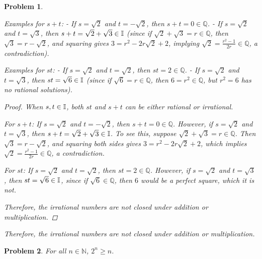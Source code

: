 \documentclass[12pt]{article}
\newtheorem{problem}{Problem}
\newcommand{\QQ}{\ensuremath{\mathbb Q}}
\newcommand{\NN}{\ensuremath{\mathbb N}}
\begin{document}
\begin{problem}
\begin{enumerate}[(a)]
Examples for $s + t$:
- If $s = \sqrt{2}$ and $t = -\sqrt{2}$, then $s + t = 0 \in \QQ$.
- If $s = \sqrt{2}$ and $t = \sqrt{3}$, then $s + t = \sqrt{2} + \sqrt{3} \in \mathbb{I}$ (since if $\sqrt{2} + \sqrt{3} = r \in \QQ$, then $\sqrt{3} = r - \sqrt{2}$, and squaring gives $3 = r^2 - 2r\sqrt{2} + 2$, implying $\sqrt{2} = \frac{r^2 - 1}{2r} \in \QQ$, a contradiction).

Examples for $st$:
- If $s = \sqrt{2}$ and $t = \sqrt{2}$, then $st = 2 \in \QQ$.
- If $s = \sqrt{2}$ and $t = \sqrt{3}$, then $st = \sqrt{6} \in \mathbb{I}$ (since if $\sqrt{6} = r \in \QQ$, then $6 = r^2 \in \QQ$, but $r^2 = 6$ has no rational solutions).

\begin{proof}
When $s, t \in \mathbb{I}$, both $st$ and $s + t$ can be either rational or irrational.

For $s + t$: If $s = \sqrt{2}$ and $t = -\sqrt{2}$, then $s + t = 0 \in \QQ$. However, if $s = \sqrt{2}$ and $t = \sqrt{3}$, then $s + t = \sqrt{2} + \sqrt{3} \in \mathbb{I}$. To see this, suppose $\sqrt{2} + \sqrt{3} = r \in \QQ$. Then $\sqrt{3} = r - \sqrt{2}$, and squaring both sides gives $3 = r^2 - 2r\sqrt{2} + 2$, which implies $\sqrt{2} = \frac{r^2 - 1}{2r} \in \QQ$, a contradiction.

For $st$: If $s = \sqrt{2}$ and $t = \sqrt{2}$, then $st = 2 \in \QQ$. However, if $s = \sqrt{2}$ and $t = \sqrt{3}$, then $st = \sqrt{6} \in \mathbb{I}$, since if $\sqrt{6} \in \QQ$, then $6$ would be a perfect square, which it is not.

Therefore, the irrational numbers are not closed under addition or multiplication.
\end{proof}
Therefore, the irrational numbers are not closed under addition or multiplication.
\end{enumerate}
\end{problem}


\begin{problem} %
For all $n\in\NN$, $2^n \ge n$.
\end{problem}
\end{document}
